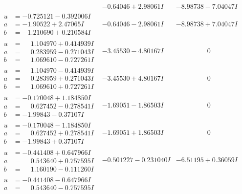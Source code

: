 \documentclass[1p]{elsarticle_modified}
\theoremstyle{definition}
\begin{document}
$$\begin{array}{c|c|c}
 & -0.64046 + 2.98061 I & -8.98738 - 7.04047 I \\ \hline\begin{aligned}
u &= -0.725121 - 0.392006 I \\
a &= -1.90522 + 2.47065 I \\
b &= -1.210690 + 0.210584 I\end{aligned}
 & -0.64046 - 2.98061 I & -8.98738 + 7.04047 I \\ \hline\begin{aligned}
u &= \phantom{-}1.104970 + 0.414939 I \\
a &= \phantom{-}0.283959 - 0.271043 I \\
b &= \phantom{-}1.069610 - 0.727261 I\end{aligned}
 & -3.45530 - 4.80167 I & \phantom{-0.000000 } 0 \\ \hline\begin{aligned}
u &= \phantom{-}1.104970 - 0.414939 I \\
a &= \phantom{-}0.283959 + 0.271043 I \\
b &= \phantom{-}1.069610 + 0.727261 I\end{aligned}
 & -3.45530 + 4.80167 I & \phantom{-0.000000 } 0 \\ \hline\begin{aligned}
u &= -0.170048 + 1.184850 I \\
a &= \phantom{-}0.627452 - 0.278541 I \\
b &= -1.99843 - 0.37107 I\end{aligned}
 & -1.69051 - 1.86503 I & \phantom{-0.000000 } 0 \\ \hline\begin{aligned}
u &= -0.170048 - 1.184850 I \\
a &= \phantom{-}0.627452 + 0.278541 I \\
b &= -1.99843 + 0.37107 I\end{aligned}
 & -1.69051 + 1.86503 I & \phantom{-0.000000 } 0 \\ \hline\begin{aligned}
u &= -0.441408 + 0.647966 I \\
a &= \phantom{-}0.543640 + 0.757595 I \\
b &= \phantom{-}1.160190 - 0.111260 I\end{aligned}
 & -0.501227 - 0.231040 I & -6.51195 + 0.36059 I \\ \hline\begin{aligned}
u &= -0.441408 - 0.647966 I \\
a &= \phantom{-}0.543640 - 0.757595 I \\

\end{aligned}
\end{array}$$
\end{document}
